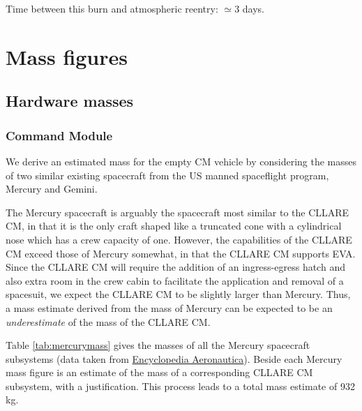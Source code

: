 \documentclass{report}
\begin{document}
Time between this burn and atmospheric reentry: $\simeq 3$ days.

\section{Mass figures}

\subsection{Hardware masses}

\subsubsection{Command Module}

We derive an estimated mass for the empty CM vehicle by considering the masses of two similar existing spacecraft from the US manned spaceflight program, Mercury and Gemini.

The Mercury spacecraft is arguably the spacecraft most similar to the CLLARE CM, in that it is the only craft shaped like a truncated cone with a cylindrical nose which has a crew capacity of one.  However, the capabilities of the CLLARE CM exceed those of Mercury somewhat, in that the CLLARE CM supports EVA.  Since the CLLARE CM will require the addition of an ingress-egress hatch and also extra room in the crew cabin to facilitate the application and removal of a spacesuit, we expect the CLLARE CM to be slightly larger than Mercury.  Thus, a mass estimate derived from the mass of Mercury can be expected to be an \emph{underestimate} of the mass of the CLLARE CM.

Table \ref{tab:mercurymass} gives the masses of all the Mercury spacecraft subsystems (data taken from \href{http://www.astronautix.com/craft/mercury.htm}{Encyclopedia Aeronautica}).  Beside each Mercury mass figure is an estimate of the mass of a corresponding CLLARE CM subsystem, with a justification.  This process leads to a total mass estimate of 932 kg.
 
\end{document}

